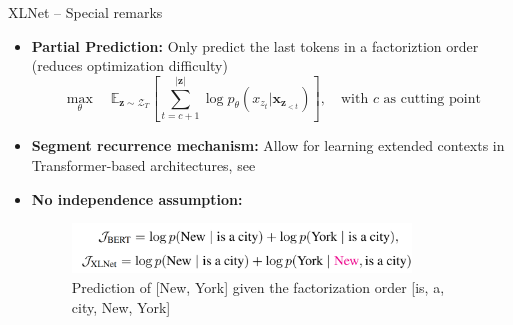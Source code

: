 \begin{frame}{XLNet -- Special remarks}
	
\vfill

	\begin{itemize}
		\item \textbf{Partial Prediction:} Only predict the last tokens in a factoriztion order (reduces optimization difficulty)
					{\small $$\max_{\theta} \quad \mathds{E}_{\mathbf{z}\sim\mathcal{Z}_T} \left[ \sum_{t=c+1}^{|\mathbf{z}|} \log p_\theta (x_{z_t} | \mathbf{x}_{\mathbf{z}_{< t}}) \right],\quad \mbox{with $c$ as cutting point}$$}
		\item \textbf{Segment recurrence mechanism:} Allow for learning extended contexts in Transformer-based architectures, see 
		\item \textbf{No independence assumption:}
	\begin{figure}
		\centering
		\includegraphics[width = 9cm]{figure/61-xlnet-objective}\\ 
		{\tiny Prediction of [New, York] given the factorization order [is, a, city, New, York]}\\
	\end{figure}
	\end{itemize}
	
\vfill

\end{frame}


